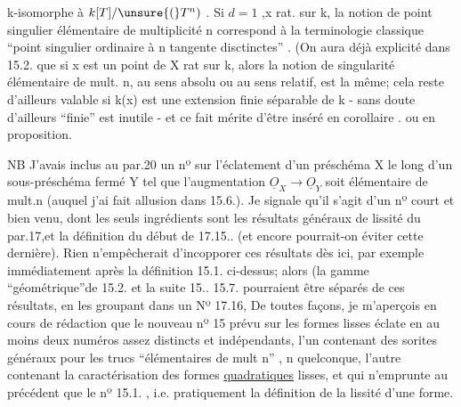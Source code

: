 
k-isomorphe à $k[T]/\unsure{(}T^n)$ . Si $d=1$ ,x rat. sur k, la notion de point singulier
 élémentaire de multiplicité n correspond à la terminologie
classique ``point singulier ordinaire à n tangente disctinctes'' .
\placedmargin{(}(On aura déjà explicité dans 15.2. que si x est un point de X rat sur k, alors
la notion de singularité élémentaire de mult. n, au sens absolu ou au
sens relatif,  est la même; cela reste d'ailleurs valable si k(x)
est une extension finie séparable de k - sans doute d'ailleurs ``finie''
est inutile - et ce fait mérite d'être inséré en corollaire .
ou en proposition\hand{)}.

NB J'avais inclus au par.20 un nº sur l'éclatement d'un
préschéma X le long d'un sous-préschéma fermé Y tel que l'augmentation
$\underline{O}_X \longrightarrow \underline{O}_Y$ soit élémentaire de mult.n (auquel j'ai fait allusion dans
15.6.). Je signale qu'il s'agit d'un nº court et bien venu, dont les
seuls ingrédients sont les résultats généraux de lissité du par.17,et
la définition du début de 17.15.. (et encore pourrait-on éviter cette dernière). Rien n'empêcherait d'incopporer ces résultats
dès ici,  par exemple immédiatement après la définition
15.1. ci-dessus; alors (la gamme ``géométrique''de 15.2. et la suite 15..  15.7. pourraient être séparés
de ces  résultats, en les groupant dans un Nº 17.16, 
 De toutes façons, je m'aperçois en cours de rédaction que le
\placedmargin{(}nouveau nº 15 prévu sur les formes lisses éclate en au moins deux numéros assez
distincts et indépendants, l'un contenant des sorites généraux pour
les trucs ``élémentaires de mult n'' , n quelconque, l'autre  contenant la
caractérisation des formes \uline{quadratiques} lisses, et qui n'emprunte au
précédent que le nº 15.1. , i.e. pratiquement la définition de la lissité
d'une forme.

